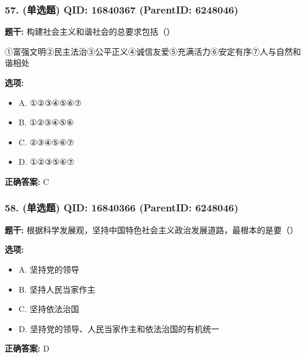 \documentclass[12pt,UTF8]{ctexart}
\begin{document}
\subsubsection*{57. (单选题) \small QID: 16840367 (ParentID: 6248046)}

\textbf{题干:}
构建社会主义和谐社会的总要求包括（）
\par
①富强文明②民主法治③公平正义④诚信友爱⑤充满活力⑥安定有序⑦人与自然和谐相处



\textbf{选项:}
\begin{itemize}[leftmargin=*]

  \item A. ①②③④⑤⑥⑦

  \item B. ①②③④⑤⑥

  \item C. ②③④⑤⑥⑦

  \item D. ①②③⑤⑥⑦

\end{itemize}

\textbf{正确答案:}
C

\vspace{0.3em}\hrulefill\vspace{0.7em}

\subsubsection*{58. (单选题) \small QID: 16840366 (ParentID: 6248046)}

\textbf{题干:}
根据科学发展观，坚持中国特色社会主义政治发展道路，最根本的是要（）



\textbf{选项:}
\begin{itemize}[leftmargin=*]

  \item A. 坚持党的领导

  \item B. 坚持人民当家作主

  \item C. 坚持依法治国

  \item D. 坚持党的领导、人民当家作主和依法治国的有机统一

\end{itemize}

\textbf{正确答案:}
D

\vspace{0.3em}\hrulefill\vspace{0.7em}
\end{document}
